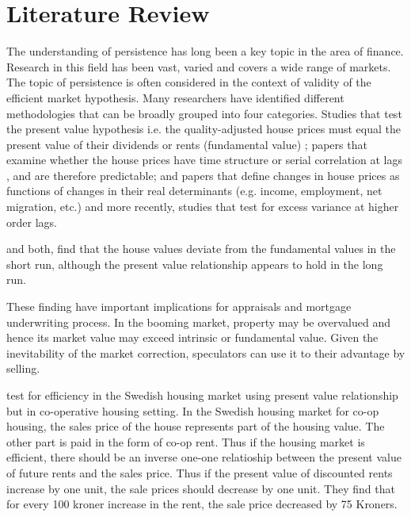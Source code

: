\documentclass[AEJ,reqno, draftmode]{AEA}
\begin{document}
\section{Literature Review}

The understanding of persistence has long been a key topic in the area of finance. Research in this field has been vast, varied and covers a wide range of markets. The topic of persistence is often considered in the context of validity of the efficient market hypothesis. Many researchers have identified different methodologies that can be broadly grouped into four categories. Studies that test the present value hypothesis i.e. the quality-adjusted house prices must equal the present value of their dividends or rents (fundamental value) \citep{meese1994testing, clayton1996rational, clayton1998further}; papers that examine whether the house prices have time structure or serial correlation at lags \citet{Case1989125, hosios1991measuring}, and are therefore predictable; and papers that define changes in house prices as functions of changes in their real determinants (e.g. income, employment, net migration, etc.) and more recently, studies that test for excess variance at higher order lags. 

\citet{clayton1996rational} and \citet{meese1994testing} both, find that the house values deviate from the fundamental values in the short run, although the present value relationship appears to hold in the long run. 

\citet{clayton1998further} These finding have important implications for appraisals and mortgage underwriting process. In the booming market, property may be overvalued and hence its market value may exceed intrinsic or fundamental value. Given the inevitability of the market correction, speculators can use it to their advantage by selling.

\citet{Hjalmarsson2009EfficiencyDiscount} test for efficiency in the Swedish housing market using present value relationship but in co-operative housing setting. In the Swedish housing market for co-op housing, the sales price of the house represents part of the housing value. The other part is paid in the form of co-op rent. Thus if the housing market is efficient, there should be an inverse one-one relatioship between the present value of future rents and the sales price. Thus if the present value of discounted rents increase by one unit, the sale prices should decrease by one unit. They find that for every 100 kroner increase in the rent, the sale price decreased by 75 Kroners.
\end{document}
